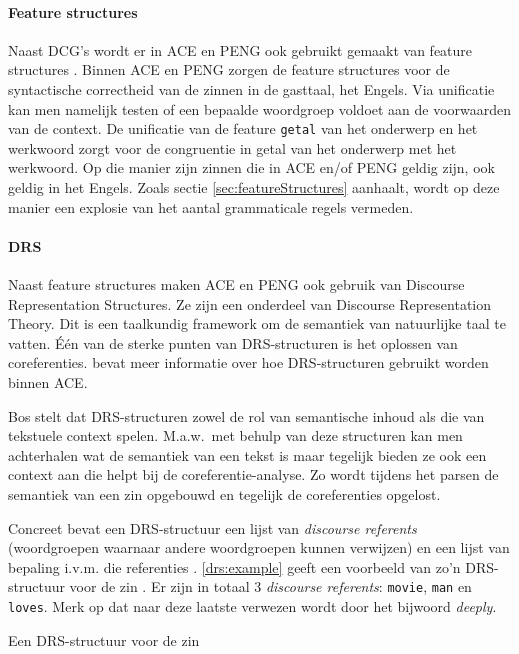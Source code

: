 \paragraph{Feature structures} Naast DCG's wordt er in ACE en PENG ook gebruikt gemaakt van feature structures \cite{Shieber2003, NLPCourse}. Binnen ACE en PENG zorgen de feature structures voor de syntactische correctheid van de zinnen in de gasttaal, het Engels. Via unificatie kan men namelijk testen of een bepaalde woordgroep voldoet aan de voorwaarden van de context. De unificatie van de feature \texttt{getal} van het onderwerp en het werkwoord zorgt voor de congruentie in getal van het onderwerp met het werkwoord. Op die manier zijn zinnen die in ACE en/of PENG geldig zijn, ook geldig in het Engels. Zoals sectie \ref{sec:featureStructures} aanhaalt, wordt op deze manier een explosie van het aantal grammaticale regels vermeden.

\paragraph{DRS} Naast feature structures maken ACE en PENG ook gebruik van Discourse Representation Structures. Ze zijn een onderdeel van Discourse Representation Theory. Dit is een taalkundig framework om de semantiek van natuurlijke taal te vatten. Één van de sterke punten van DRS-structuren is het oplossen van coreferenties. \cite{Fuchs2008drs} bevat meer informatie over hoe DRS-structuren gebruikt worden binnen ACE.

Bos \cite{Bos2011} stelt dat DRS-structuren zowel de rol van semantische inhoud als die van tekstuele context spelen. M.a.w.\ met behulp van deze structuren kan men achterhalen wat de semantiek van een tekst is maar tegelijk bieden ze ook een context aan die helpt bij de coreferentie-analyse. Zo wordt tijdens het parsen de semantiek van een zin opgebouwd en tegelijk de coreferenties opgelost.

Concreet bevat een DRS-structuur een lijst van \textit{discourse referents} (woordgroepen waarnaar andere woordgroepen kunnen verwijzen) en een lijst van bepaling i.v.m. die referenties \cite{Bos2011}. \ref{drs:example} geeft een voorbeeld van zo'n DRS-structuur voor de zin . Er zijn in totaal 3 \textit{discourse referents}: \texttt{movie}, \texttt{man} en \texttt{loves}. Merk op dat naar deze laatste verwezen wordt door het bijwoord \textit{deeply}.

\begin{savenotes}
  \begin{drsFloat}
    \centering
    \caption{Een DRS-structuur voor de zin  \protect\footnotemark}
    \label{drs:example}
  \end{drsFloat}
\end{savenotes}


